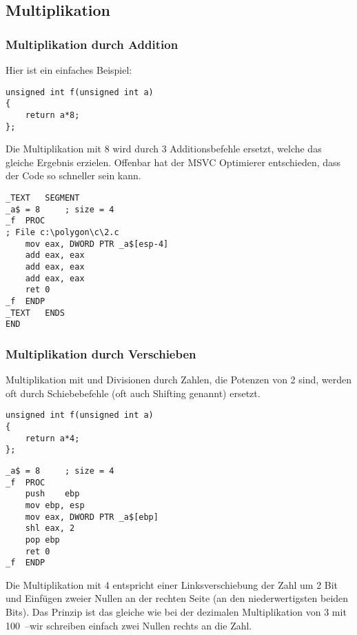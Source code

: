 \subsection{Multiplikation}

\subsubsection{Multiplikation durch Addition}

Hier ist ein einfaches Beispiel:

\begin{lstlisting}[style=customc]
unsigned int f(unsigned int a)
{
	return a*8;
};
\end{lstlisting}

Die Multiplikation mit 8 wird durch 3 Additionsbefehle ersetzt, welche das
gleiche Ergebnis erzielen. Offenbar hat der MSVC Optimierer entschieden, dass
der Code so schneller sein kann.

\begin{lstlisting}[caption=\Optimizing MSVC 2010,style=customasmx86]
_TEXT	SEGMENT
_a$ = 8		; size = 4
_f	PROC
; File c:\polygon\c\2.c
	mov	eax, DWORD PTR _a$[esp-4]
	add	eax, eax
	add	eax, eax
	add	eax, eax
	ret	0
_f	ENDP
_TEXT	ENDS
END
\end{lstlisting}

\subsubsection{Multiplikation durch Verschieben}
\label{subsec:mult_using_shifts}
Multiplikation mit und Divisionen durch Zahlen, die Potenzen von 2 sind, werden
oft durch Schiebebefehle (oft auch Shifting genannt) ersetzt.

\begin{lstlisting}[style=customc]
unsigned int f(unsigned int a)
{
	return a*4;
};
\end{lstlisting}

\begin{lstlisting}[caption=\NonOptimizing MSVC 2010,style=customasmx86]
_a$ = 8		; size = 4
_f	PROC
	push	ebp
	mov	ebp, esp
	mov	eax, DWORD PTR _a$[ebp]
	shl	eax, 2
	pop	ebp
	ret	0
_f	ENDP
\end{lstlisting}

Die Multiplikation mit 4 entspricht einer Linksverschiebung der Zahl um 2 Bit
und Einfügen zweier Nullen an der rechten Seite (an den niederwertigsten beiden
Bits). Das Prinzip ist das gleiche wie bei der dezimalen Multiplikation von 3
mit 100~--wir schreiben einfach zwei Nullen rechts an die Zahl.


